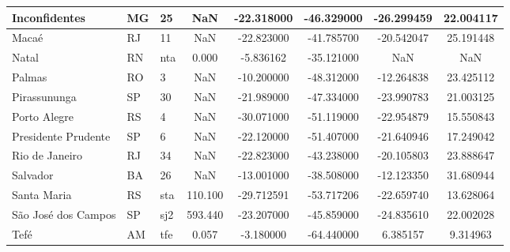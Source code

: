 \begin{table}
\begin{tabular}{|l|l|l|c|c|c|c|c|}
Inconfidentes       &    MG &                    25 &       NaN & -22.318000 & -46.329000 &    -26.299459 &      22.004117   \\ \hline
Macaé               &    RJ &                    11 &       NaN & -22.823000 & -41.785700 &    -20.542047 &      25.191448   \\ \hline
Natal               &    RN &                   nta &     0.000 &  -5.836162 & -35.121000 &           NaN &            NaN   \\ \hline
Palmas              &    RO &                     3 &       NaN & -10.200000 & -48.312000 &    -12.264838 &      23.425112   \\ \hline
Pirassununga        &    SP &                    30 &       NaN & -21.989000 & -47.334000 &    -23.990783 &      21.003125   \\ \hline
Porto Alegre        &    RS &                     4 &       NaN & -30.071000 & -51.119000 &    -22.954879 &      15.550843   \\ \hline
Presidente Prudente &    SP &                     6 &       NaN & -22.120000 & -51.407000 &    -21.640946 &      17.249042   \\ \hline
Rio de Janeiro      &    RJ &                    34 &       NaN & -22.823000 & -43.238000 &    -20.105803 &      23.888647   \\ \hline
Salvador            &    BA &                    26 &       NaN & -13.001000 & -38.508000 &    -12.123350 &      31.680944   \\ \hline
Santa Maria         &    RS &                   sta &   110.100 & -29.712591 & -53.717206 &    -22.659740 &      13.628064   \\ \hline
São José dos Campos &    SP &                   sj2 &   593.440 & -23.207000 & -45.859000 &    -24.835610 &      22.002028   \\ \hline
Tefé                &    AM &                   tfe &     0.057 &  -3.180000 & -64.440000 &      6.385157 &       9.314963   \\ \hline
\end{tabular}\label{tab:stations}

\vspace{12pt}


\end{table}
